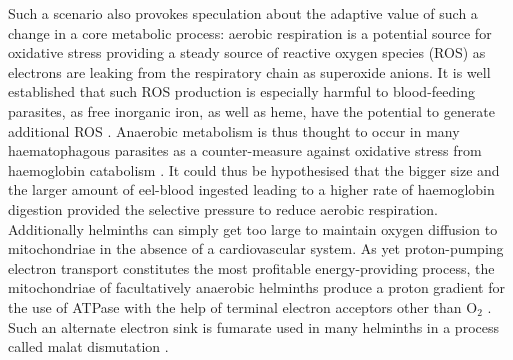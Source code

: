 
Such a scenario also provokes speculation about the adaptive value of
such a change in a core metabolic process: aerobic respiration is a
potential source for oxidative stress providing a steady source of
reactive oxygen species (ROS) as electrons are leaking from the
respiratory chain as superoxide anions. It is well established that
such ROS production is especially harmful to blood-feeding parasites,
as free inorganic iron, as well as heme, have the potential to
generate additional ROS \cite{pmid21087517}. Anaerobic metabolism is
thus thought to occur in many haematophagous parasites as a
counter-measure against oxidative stress from haemoglobin catabolism
\cite{pmid12163151}. It could thus be hypothesised that the bigger
size and the larger amount of eel-blood ingested leading to a higher
rate of haemoglobin digestion provided the selective pressure to
reduce aerobic respiration. Additionally helminths can simply get too
large to maintain oxygen diffusion to mitochondriae in the absence of
a cardiovascular system. As yet proton-pumping electron transport
constitutes the most profitable energy-providing process, the
mitochondriae of facultatively anaerobic helminths produce a proton
gradient for the use of ATPase with the help of terminal electron
acceptors other than O$_2$ \cite{pmid12417132}. Such an alternate
electron sink is fumarate used in many helminths in a process called
malat dismutation \cite{pmid15275412}.

